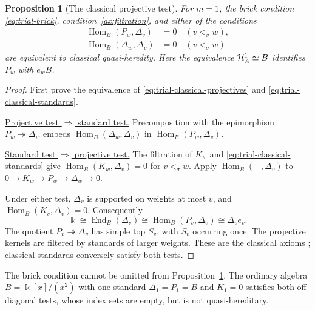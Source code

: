 \documentclass[11pt,a4paper]{article}
\renewcommand{\H}{\mathcal H}
\newcommand{\std}{\Delta}
\DeclareMathOperator{\Hom}{Hom}
\DeclareMathOperator{\End}{End}
\let\mod\relax
\DeclareMathOperator{\mod}{mod}
\theoremstyle{plain}
\newtheorem{proposition}[theorem]{Proposition}
\theoremstyle{definition}
\numberwithin{equation}{section}
\begin{document}
\begin{proposition}[The classical projective test]
\label{prop:trial-classical}
For $m=1$, the brick condition \eqref{eq:trial-brick},
condition~\ref{ax:filtration}, and either of the conditions
\begin{align}
 \Hom_B(P_w,\std_v)&=0\quad(v<_\sigma w),
 \label{eq:trial-classical-projectives}\\
 \Hom_B(\std_w,\std_v)&=0\quad(v<_\sigma w)
 \label{eq:trial-classical-standards}
\end{align}
are equivalent to classical quasi-heredity. Here the equivalence
$\H_A^1\simeq\mod B$ identifies $P_w$ with $e_wB$.
\end{proposition}
\begin{proof}
First prove the equivalence of
\eqref{eq:trial-classical-projectives} and
\eqref{eq:trial-classical-standards}.

\noindent\underline{Projective test $\Rightarrow$ standard test.}
Precomposition with the epimorphism $P_w\twoheadrightarrow\std_w$
embeds $\Hom_B(\std_w,\std_v)$ in $\Hom_B(P_w,\std_v)$.

\noindent\underline{Standard test $\Rightarrow$ projective test.}
The filtration of $K_w$ and
\eqref{eq:trial-classical-standards} give
$\Hom_B(K_w,\std_v)=0$ for $v<_\sigma w$.
Apply $\Hom_B(-,\std_v)$ to
$0\to K_w\to P_w\to\std_w\to0$.

Under either test, $\std_v$ is supported on weights at most $v$,
and $\Hom_B(K_v,\std_v)=0$. Consequently
\[
 \Bbbk\cong\End_B(\std_v)
 \cong\Hom_B(P_v,\std_v)\cong\std_ve_v.
\]
The quotient $P_v\twoheadrightarrow\std_v$ has simple top $S_v$,
with $S_v$ occurring once. The projective kernels are filtered by
standards of larger weights. These are the classical axioms
\cite[\S2.1]{BB26}; classical standards conversely satisfy both tests.
\end{proof}

The brick condition cannot be omitted from
Proposition~\ref{prop:trial-classical}. The ordinary algebra
$B=\Bbbk[x]/(x^2)$ with one standard $\std_1=P_1=B$ and $K_1=0$
satisfies both off-diagonal tests, whose index sets are empty,
but is not quasi-hereditary.
\end{document}

